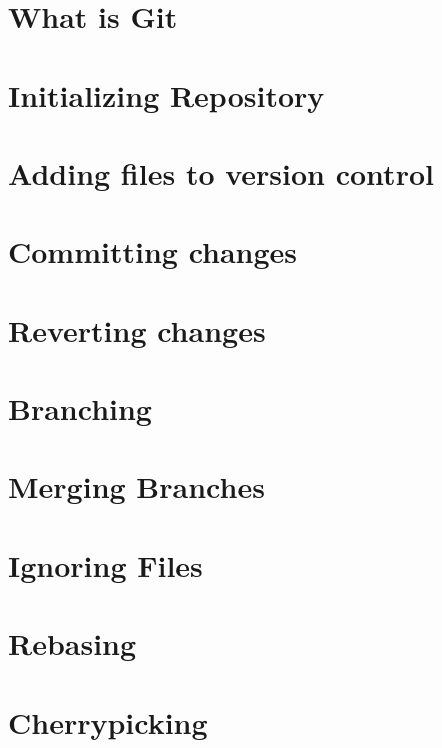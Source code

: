 \documentclass{amsart}
\begin{document}
\newpage

\section*{What is Git}

\newpage

\section*{Initializing Repository}

\newpage

\section*{Adding files to version control}

\newpage

\section*{Committing changes}

\newpage

\section*{Reverting changes}

\newpage

\section*{Branching}

\newpage

\section*{Merging Branches}

\newpage

\section*{Ignoring Files}

\newpage

\section*{Rebasing}

\newpage

\section*{Cherrypicking}
\end{document}
